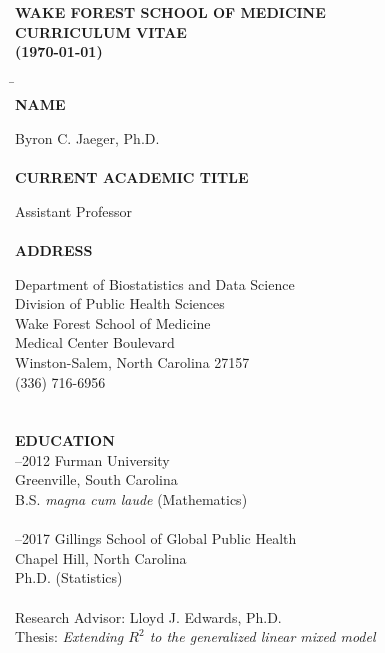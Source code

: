 \documentclass[11pt]{cv_wakeforest_article}
\newcommand{\AR}[1]{#1}  %
\begin{document}
\pagestyle{fancy}
\thispagestyle{empty}

\begin{center}
{\bfseries\Large 
WAKE FOREST SCHOOL OF MEDICINE \\ CURRICULUM VITAE \\[1em] (\today)
}
\end{center}

\begin{tabbing}

\hspace{1.85 in} \= \hspace{1.05in} \= \\

\bfseries \large NAME

\>\> Byron C. Jaeger, Ph.D. \\

\\

\bfseries \large CURRENT ACADEMIC TITLE

\>\> Assistant Professor \\

\\

\bfseries\large  ADDRESS


\>\>Department of Biostatistics and Data Science\\
\>\>Division of Public Health Sciences\\
\>\>Wake Forest School of Medicine\\
\>\>Medical Center Boulevard\\
\>\>Winston-Salem, North Carolina 27157\\
\>\>(336) 716-6956\\
\>\\
\\


{\bfseries\large  EDUCATION}  \\
--2012\> Furman University \\
\>\>Greenville, South Carolina \\
\>\>B.S. \emph{magna cum laude} (Mathematics) \\
\\
--2017\> Gillings School of Global Public Health \\
\>\>Chapel Hill, North Carolina \\
\>\>Ph.D. (Statistics)\\
\\
\>\>Research Advisor:  Lloyd J. Edwards, Ph.D.\\
\>\>Thesis:  \emph{Extending $R^2$ to the generalized linear mixed model}
\end{tabbing}
\end{document}
